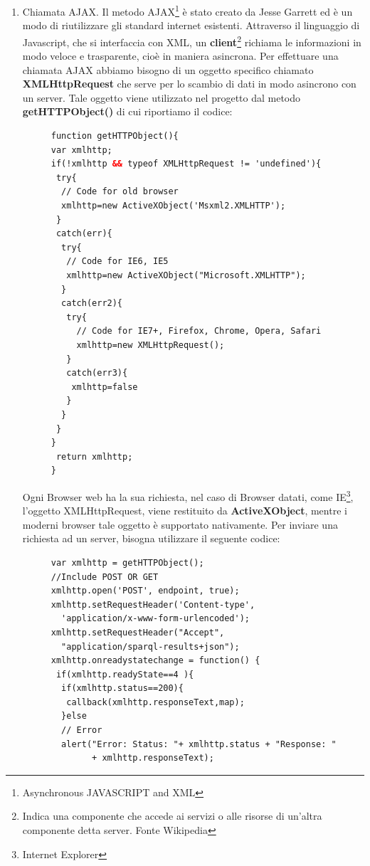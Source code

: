 \documentclass[a4paper,11pt]{article}
\begin{document}
\begin{enumerate}
\begin{enumerate}[label*=\arabic*.]
			\item Chiamata AJAX.\newline
			Il metodo AJAX\footnote{Asynchronous JAVASCRIPT and XML} è stato creato da Jesse Garrett ed è un modo di riutilizzare gli standard internet esistenti. 
Attraverso il linguaggio di Javascript, che si interfaccia con XML, un \textbf{client}\footnote{Indica una componente che accede ai servizi o alle risorse di un'altra componente detta server. Fonte Wikipedia} richiama le informazioni in modo veloce e trasparente, cioè in maniera asincrona. Per effettuare una chiamata AJAX abbiamo bisogno di un oggetto specifico chiamato \textbf{XMLHttpRequest} che serve per lo scambio di dati in modo asincrono con un server.
Tale oggetto viene utilizzato nel progetto dal metodo \textbf{getHTTPObject()}
di cui riportiamo il codice:
\begin{figure}[htb]
\begin{lstlisting}[language=HTML, basicstyle=\large]
function getHTTPObject(){
var xmlhttp;
if(!xmlhttp && typeof XMLHttpRequest != 'undefined'){
 try{
  // Code for old browser
  xmlhttp=new ActiveXObject('Msxml2.XMLHTTP');
 }
 catch(err){
  try{
   // Code for IE6, IE5
   xmlhttp=new ActiveXObject("Microsoft.XMLHTTP");
  }
  catch(err2){
   try{
	 // Code for IE7+, Firefox, Chrome, Opera, Safari
	 xmlhttp=new XMLHttpRequest();
   }
   catch(err3){
    xmlhttp=false
   }
  }			
 }
}
 return xmlhttp;
}		
\end{lstlisting}
\end{figure}\newline
Ogni Browser web ha la sua richiesta, nel caso di Browser datati, come IE\footnote{Internet Explorer}, l'oggetto XMLHttpRequest, viene restituito da \textbf{ActiveXObject}, mentre i moderni browser tale oggetto è supportato nativamente.\newline
Per inviare una richiesta ad un server, bisogna utilizzare il seguente codice:
\begin{figure}[htb]
\begin{lstlisting}[language=HTML, basicstyle=\large]
var xmlhttp = getHTTPObject();
//Include POST OR GET
xmlhttp.open('POST', endpoint, true); 
xmlhttp.setRequestHeader('Content-type',
  'application/x-www-form-urlencoded');
xmlhttp.setRequestHeader("Accept", 
  "application/sparql-results+json");	
xmlhttp.onreadystatechange = function() {
 if(xmlhttp.readyState==4 ){
  if(xmlhttp.status==200){				
   callback(xmlhttp.responseText,map);
  }else
  // Error
  alert("Error: Status: "+ xmlhttp.status + "Response: "
		+ xmlhttp.responseText);

\end{lstlisting}
\end{figure}
\end{enumerate}
\end{enumerate}
\end{document}
